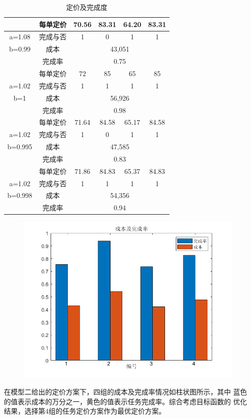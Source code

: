 \begin{longtable}[c]{cccccc}
    \caption{定价及完成度}
    \label{tab:my-table}\\
    \hline
            & 每单定价 & 70.56 & 83.31 & 64.20 & 83.31 \\
    \endfirsthead
    \endhead
    \hline
    \endfoot
    \endlastfoot
    a=1.08  & 完成与否 & 1     & 0     & 1     & 1     \\
    b=0.99  & 成本   & \multicolumn{4}{c}{43,051}    \\
            & 完成率  & \multicolumn{4}{c}{0.75}      \\
            & 每单定价 & 72    & 85    & 65    & 85    \\
    a=1.02  & 完成与否 & 1     & 1     & 1     & 1     \\
    b=1     & 成本   & \multicolumn{4}{c}{56,926}    \\
            & 完成率  & \multicolumn{4}{c}{0.98}      \\
            & 每单定价 & 71.64 & 84.58 & 65.17 & 84.58 \\
    a=1.02  & 完成与否 & 1     & 0     & 1     & 1     \\
    b=0.995 & 成本   & \multicolumn{4}{c}{47,585}    \\
            & 完成率  & \multicolumn{4}{c}{0.83}      \\
            & 每单定价 & 71.86 & 84.83 & 65.37 & 84.83 \\
    a=1.02  & 完成与否 & 1     & 1     & 1     & 1     \\
    b=0.998 & 成本   & \multicolumn{4}{c}{54,356}    \\
            & 完成率  & \multicolumn{4}{c}{0.94}      \\ \hline
    \end{longtable}

\begin{figure}[H]
    \centering
    \includegraphics[width=1\textwidth]{chengben.png}
    \label{成本}
\end{figure}
在模型二给出的定价方案下，四组的成本及完成率情况如柱状图所示，其中
蓝色的值表示成本的万分之一，黄色的值表示任务完成率。综合考虑目标函数的
优化结果，选择第4组的任务定价方案作为最优定价方案。

